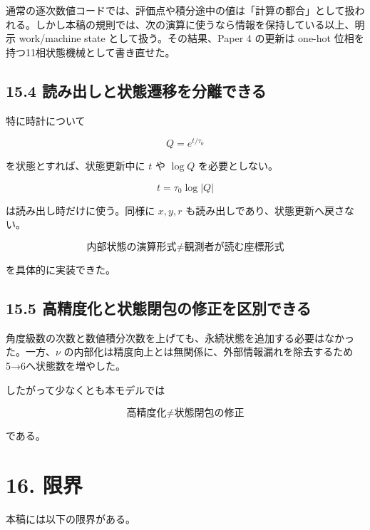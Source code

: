 \documentclass[
  a4paper,
]{ltjsarticle}
\begin{document}
通常の逐次数値コードでは、評価点や積分途中の値は「計算の都合」として扱われる。しかし本稿の規則では、次の演算に使うなら情報を保持している以上、明示
work/machine state として扱う。その結果、Paper 4 の更新は one-hot
位相を持つ11相状態機械として書き直せた。

\subsection{15.4
読み出しと状態遷移を分離できる}\label{ux8aadux307fux51faux3057ux3068ux72b6ux614bux9077ux79fbux3092ux5206ux96e2ux3067ux304dux308b}

特に時計について

\[
Q=e^{t/\tau_0}
\]

を状態とすれば、状態更新中に \(t\) や \(\log Q\) を必要としない。

\[
t=\tau_0\log|Q|
\]

は読み出し時だけに使う。同様に \(x,y,r\)
も読み出しであり、状態更新へ戻さない。

\[
\boxed{
\text{内部状態の演算形式}
\neq
\text{観測者が読む座標形式}
}
\]

を具体的に実装できた。

\subsection{15.5
高精度化と状態閉包の修正を区別できる}\label{ux9ad8ux7cbeux5ea6ux5316ux3068ux72b6ux614bux9589ux5305ux306eux4feeux6b63ux3092ux533aux5225ux3067ux304dux308b}

角度級数の次数と数値積分次数を上げても、永続状態を追加する必要はなかった。一方、\(\nu\)
の内部化は精度向上とは無関係に、外部情報漏れを除去するため5→6へ状態数を増やした。

したがって少なくとも本モデルでは

\[
\boxed{
\text{高精度化}
\neq
\text{状態閉包の修正}
}
\]

である。

\section{16. 限界}\label{ux9650ux754c}

本稿には以下の限界がある。
\end{document}
